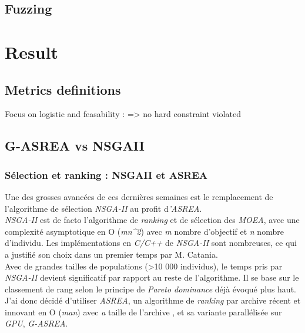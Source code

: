 \documentclass[12pt]{memoir}
\begin{document}
\subsection{Fuzzing}

\section{Result}
\subsection{Metrics definitions}
Focus on logistic and feasability : => no hard constraint violated
\subsection{G-ASREA vs NSGAII}
\subsubsection{Sélection et ranking : NSGAII et
	ASREA}\label{suxe9lection-et-ranking-nsgaii-et-asrea}

Une des grosses avancées de ces dernières semaines est le remplacement
de l'algorithme de sélection \emph{NSGA-II\cite{deb2002fast}} au profit d\emph{'ASREA\cite{sharma2010archived,tsutsui2013massively}}.\\
\emph{NSGA-II} est de facto l'algorithme de \emph{ranking} et de
sélection des \emph{MOEA}, avec une complexité asymptotique en O
(\emph{mn\^{}2}) avec \emph{m} nombre d'objectif et \emph{n} nombre
d'individu. Les implémentations en \emph{C/C++} de \emph{NSGA-II} sont
nombreuses, ce qui a justifié son choix dans un premier temps par M.
Catania.\\
Avec de grandes tailles de populations (\textgreater{}10 000
individus), le temps pris par \textit{NSGA-II} devient significatif par
rapport au reste de l'algorithme. Il se base sur le classement de rang
selon le principe de \textit{Pareto dominance} déjà évoqué plus haut. J'ai donc
décidé d'utiliser \textit{ASREA}, un algorithme de \textit{ranking} par archive
récent et innovant en O (\emph{man}) avec \emph{a} taille de l'archive ,
et sa variante parallélisée sur \emph{GPU}, \emph{G-ASREA\cite{sharma2010gpgpu}}.
\end{document}
